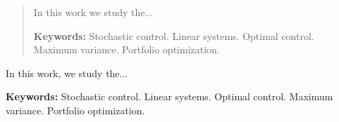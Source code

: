 \begin{abstract}

    In this work we study the...

    \vspace{1\baselineskip}

    \textbf{Keywords:} Stochastic control. Linear systems. Optimal control. Maximum variance. Portfolio optimization.

\end{abstract}

\begin{secondAbstract}

    In this work, we study the...

    \vspace{1\baselineskip}

    \textbf{Keywords:} Stochastic control. Linear systems. Optimal control. Maximum variance. Portfolio optimization.

\end{secondAbstract}
